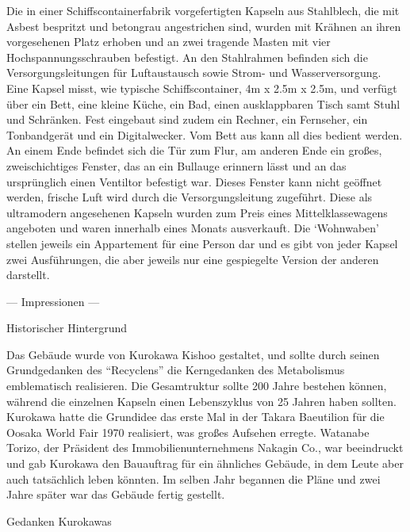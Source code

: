 \documentclass[a4paper, 12pt]{article}
\begin{document}
\begin{onehalfspace}
Die in einer Schiffscontainerfabrik vorgefertigten Kapseln aus Stahlblech, die mit Asbest bespritzt und betongrau angestrichen sind, wurden mit Krähnen an ihren vorgesehenen Platz erhoben und an zwei tragende Masten mit vier Hochspannungsschrauben befestigt. An den Stahlrahmen befinden sich die Versorgungsleitungen für Luftaustausch sowie Strom- und Wasserversorgung. Eine Kapsel misst, wie typische Schiffscontainer, 4m x 2.5m x 2.5m, und verfügt über ein Bett, eine kleine Küche, ein Bad, einen ausklappbaren Tisch samt Stuhl und Schränken. Fest eingebaut sind zudem ein Rechner, ein Fernseher, ein Tonbandgerät und ein Digitalwecker. Vom Bett aus kann all dies bedient werden. An einem Ende befindet sich die Tür zum Flur, am anderen Ende ein großes, zweischichtiges Fenster, das an ein Bullauge erinnern lässt und an das ursprünglich einen Ventiltor befestigt war. Dieses Fenster kann nicht geöffnet werden, frische Luft wird durch die Versorgungsleitung zugeführt. Diese als ultramodern angesehenen Kapseln wurden zum Preis eines Mittelklassewagens angeboten und waren innerhalb eines Monats ausverkauft. Die ‘Wohnwaben’ stellen jeweils ein Appartement für eine Person dar und es gibt von jeder Kapsel zwei Ausführungen, die aber jeweils nur eine gespiegelte Version der anderen darstellt. 

— Impressionen — 


Historischer Hintergrund

Das Gebäude wurde von Kurokawa Kishoo gestaltet, und sollte durch seinen Grundgedanken des “Recyclens” die Kerngedanken des Metabolismus emblematisch realisieren. Die Gesamtruktur sollte 200 Jahre bestehen können, während die einzelnen Kapseln einen Lebenszyklus von 25 Jahren haben sollten. Kurokawa hatte die Grundidee das erste Mal in der Takara Baeutilion für die Oosaka World Fair 1970 realisiert, was großes Aufsehen erregte. Watanabe Torizo, der Präsident des Immobilienunternehmens Nakagin Co., war beeindruckt und gab Kurokawa den Bauauftrag für ein ähnliches Gebäude, in dem Leute aber auch tatsächlich leben könnten. Im selben Jahr begannen die Pläne und zwei Jahre später war das Gebäude fertig gestellt. 


Gedanken Kurokawas


\end{onehalfspace}
\end{document}
